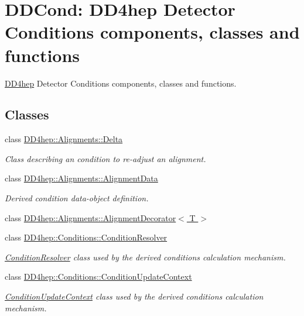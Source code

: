 \hypertarget{group___d_d4_h_e_p___c_o_n_d_i_t_i_o_n_s}{
\section{DDCond: DD4hep Detector Conditions components, classes and functions}
\label{group___d_d4_h_e_p___c_o_n_d_i_t_i_o_n_s}
}


\hyperlink{namespace_d_d4hep}{DD4hep} Detector Conditions components, classes and functions.  
\subsection*{Classes}
\begin{DoxyCompactItemize}
\item 
class \hyperlink{class_d_d4hep_1_1_alignments_1_1_delta}{DD4hep::Alignments::Delta}
\begin{DoxyCompactList}\small\item\em Class describing an condition to re-\/adjust an alignment. \item\end{DoxyCompactList}\item 
class \hyperlink{class_d_d4hep_1_1_alignments_1_1_alignment_data}{DD4hep::Alignments::AlignmentData}
\begin{DoxyCompactList}\small\item\em Derived condition data-\/object definition. \item\end{DoxyCompactList}\item 
class \hyperlink{class_d_d4hep_1_1_alignments_1_1_alignment_decorator}{DD4hep::Alignments::AlignmentDecorator$<$ T $>$}
\item 
class \hyperlink{class_d_d4hep_1_1_conditions_1_1_condition_resolver}{DD4hep::Conditions::ConditionResolver}
\begin{DoxyCompactList}\small\item\em \hyperlink{class_d_d4hep_1_1_conditions_1_1_condition_resolver}{ConditionResolver} class used by the derived conditions calculation mechanism. \item\end{DoxyCompactList}\item 
class \hyperlink{class_d_d4hep_1_1_conditions_1_1_condition_update_context}{DD4hep::Conditions::ConditionUpdateContext}
\begin{DoxyCompactList}\small\item\em \hyperlink{class_d_d4hep_1_1_conditions_1_1_condition_update_context}{ConditionUpdateContext} class used by the derived conditions calculation mechanism. \item\end{DoxyCompactList}\item 

\end{DoxyCompactItemize}
